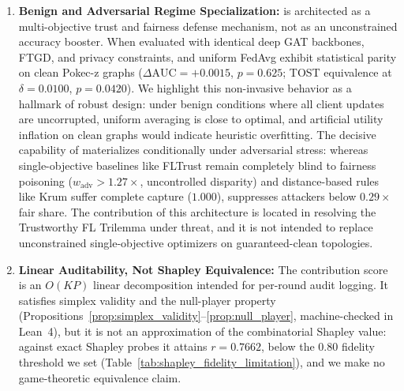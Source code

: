 \begin{enumerate}[leftmargin=*]
    \item \textbf{Benign and Adversarial Regime Specialization:} \MethodName{} is architected as a multi-objective trust and fairness defense mechanism, not as an unconstrained accuracy booster. When evaluated with identical deep GAT backbones, FTGD, and privacy constraints, \MethodName{} and uniform FedAvg exhibit statistical parity on clean Pokec-z graphs ($\Delta\mathrm{AUC} = +0.0015$, $p = 0.625$; TOST equivalence at $\delta = 0.0100$, $p = 0.0420$). We highlight this non-invasive behavior as a hallmark of robust design: under benign conditions where all client updates are uncorrupted, uniform averaging is close to optimal, and artificial utility inflation on clean graphs would indicate heuristic overfitting. The decisive capability of \MethodName{} materializes conditionally under adversarial stress: whereas single-objective baselines like FLTrust remain completely blind to fairness poisoning ($w_{\mathrm{adv}} > 1.27\times$, uncontrolled disparity) and distance-based rules like Krum suffer complete capture ($1.000$), \MethodName{} suppresses attackers below $0.29\times$ fair share. The contribution of this architecture is located in resolving the Trustworthy FL Trilemma under threat, and it is not intended to replace unconstrained single-objective optimizers on guaranteed-clean topologies.
    \item \textbf{Linear Auditability, Not Shapley Equivalence:} The contribution score is an $O(KP)$ linear decomposition intended for per-round audit logging. It satisfies simplex validity and the null-player property (Propositions~\ref{prop:simplex_validity}--\ref{prop:null_player}, machine-checked in Lean~4), but it is not an approximation of the combinatorial Shapley value: against exact Shapley probes it attains $r = 0.7662$, below the $0.80$ fidelity threshold we set (Table~\ref{tab:shapley_fidelity_limitation}), and we make no game-theoretic equivalence claim.
\end{enumerate}
